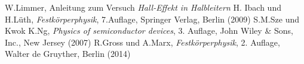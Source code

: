 \documentclass[a4paper, parskip=half, 12pt]{scrartcl}
\begin{document}




\begin{thebibliography}{10}
 W.Limmer, Anleitung zum Versuch \emph{Hall-Effekt in Halbleitern}
 H. Ibach und H.Lüth, \emph{Festkörperphysik}, 7.Auflage, Springer Verlag, Berlin (2009)
 S.M.Sze und Kwok K.Ng, \emph{Physics of semiconductor devices}, 3. Auflage, John Wiley \& Sons, Inc., New Jersey (2007)
 R.Gross und A.Marx, \emph{Festkörperphysik}, 2. Auflage, Walter de Gruyther, Berlin (2014)
\end{thebibliography}
\end{document}

